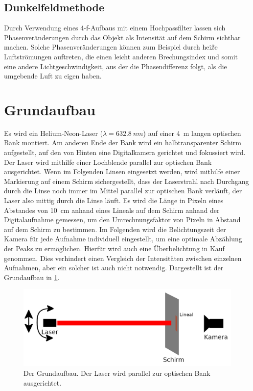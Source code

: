 \documentclass[
	a4paper,
	12pt,
	pagesize,
	ngerman
]{scrartcl}
\begin{document}
	\subsection{Dunkelfeldmethode}
	\label{sec_dunkel}

	Durch Verwendung eines 4-f-Aufbaus mit einem Hochpassfilter lassen sich Phasenveränderungen durch das Objekt als Intensität auf dem Schirm sichtbar machen.
	Solche Phasenveränderungen können zum Beispiel durch heiße Luftströmungen auftreten, die einen leicht anderen Brechungsindex und somit eine andere Lichtgeschwindigkeit, aus der die Phasendifferenz folgt, als die umgebende Luft zu eigen haben.
	\cite{Anleitung}

	\section{Grundaufbau}
	Es wird ein Helium-Neon-Laser ($ \lambda = \SI{632,8}{nm} $) auf einer \SI{4}{m} langen optischen Bank montiert.
	Am anderen Ende der Bank wird ein halbtransparenter Schirm aufgestellt, auf den von Hinten eine Digitalkamera gerichtet und fokussiert wird.
	Der Laser wird mithilfe einer Lochblende parallel zur optischen Bank ausgerichtet.
	Wenn im Folgenden Linsen eingesetzt werden, wird mithilfe einer Markierung auf einem Schirm sichergestellt, dass der Laserstrahl nach Durchgang durch die Linse noch immer im Mittel parallel zur optischen Bank verläuft, der Laser also mittig durch die Linse läuft. %
	Es wird die Länge in Pixeln eines Abstandes von \SI{10}{cm} anhand eines Lineals auf dem Schirm anhand der Digitalaufnahme gemessen, um den Umrechnungsfaktor von Pixeln in Abstand auf dem Schirm zu bestimmen.
	Im Folgenden wird die Belichtungszeit der Kamera für jede Aufnahme individuell eingestellt, um eine optimale Abzählung der Peaks zu ermöglichen.
	Hierfür wird auch eine Überbelichtung in Kauf genommen.
	Dies verhindert einen Vergleich der Intensitäten zwischen einzelnen Aufnahmen, aber ein solcher ist auch nicht notwendig.
	Dargestellt ist der Grundaufbau in \cref{fig_grundaufbau}.

	\begin{figure}[H]
			\includegraphics[width=1\linewidth]{img/grundaufbau}
			\caption{
				Der Grundaufbau. Der Laser wird parallel zur optischen Bank ausgerichtet.
			}
			\label{fig_grundaufbau}
	\end{figure}
\end{document}
